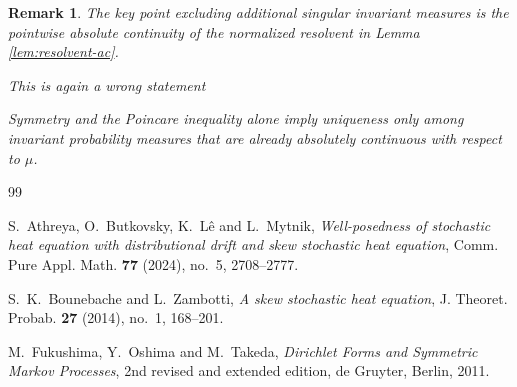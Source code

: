 \documentclass[12pt]{article}
\numberwithin{equation}{section}
\newtheorem{remark}[theorem]{Remark}
\newcommand{\1}{\mathbf 1}
\newcommand{\review}[1]{\begin{reviewbox}#1\end{reviewbox}}
\begin{document}
\begin{remark}
The key point excluding additional singular invariant measures is the pointwise
absolute continuity of the normalized resolvent in Lemma \ref{lem:resolvent-ac}. \review{This is again a wrong statement}
Symmetry and the Poincare inequality alone imply uniqueness only among invariant
probability measures that are already absolutely continuous with respect to $\mu$.
\end{remark}

\begin{thebibliography}{99}

S.~Athreya, O.~Butkovsky, K.~L\^e and L.~Mytnik,
\emph{Well-posedness of stochastic heat equation with distributional drift and skew stochastic heat equation},
Comm. Pure Appl. Math. \textbf{77} (2024), no.~5, 2708--2777.

S.~K.~Bounebache and L.~Zambotti,
\emph{A skew stochastic heat equation},
J. Theoret. Probab. \textbf{27} (2014), no.~1, 168--201.

M.~Fukushima, Y.~Oshima and M.~Takeda,
\emph{Dirichlet Forms and Symmetric Markov Processes},
2nd revised and extended edition, de Gruyter, Berlin, 2011.

\end{thebibliography}
\end{document}
